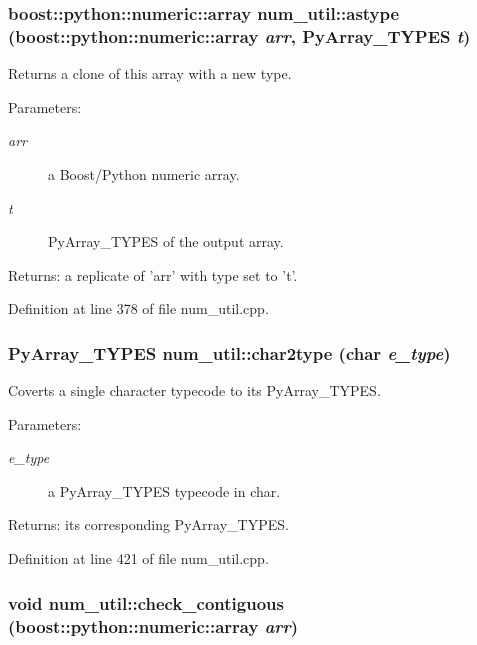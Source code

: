 \subsubsection{\setlength{\rightskip}{0pt plus 5cm}boost::python::numeric::array num\_\-util::astype (boost::python::numeric::array {\em arr}, Py\-Array\_\-TYPES {\em t})}\label{namespacenum__util_a51}


Returns a clone of this array with a new type. \begin{Desc}
\item[Parameters:]
\begin{description}
\item[{\em arr}]a Boost/Python numeric array. \item[{\em t}]Py\-Array\_\-TYPES of the output array. \end{description}
\end{Desc}
\begin{Desc}
\item[Returns:]a replicate of 'arr' with type set to 't'.\end{Desc}


Definition at line 378 of file num\_\-util.cpp.
\subsubsection{\setlength{\rightskip}{0pt plus 5cm}Py\-Array\_\-TYPES num\_\-util::char2type (char {\em e\_\-type})}\label{namespacenum__util_a57}


Coverts a single character typecode to its Py\-Array\_\-TYPES. \begin{Desc}
\item[Parameters:]
\begin{description}
\item[{\em e\_\-type}]a Py\-Array\_\-TYPES typecode in char. \end{description}
\end{Desc}
\begin{Desc}
\item[Returns:]its corresponding Py\-Array\_\-TYPES.\end{Desc}


Definition at line 421 of file num\_\-util.cpp.
\subsubsection{\setlength{\rightskip}{0pt plus 5cm}void num\_\-util::check\_\-contiguous (boost::python::numeric::array {\em arr})}\label{namespacenum__util_a70}



